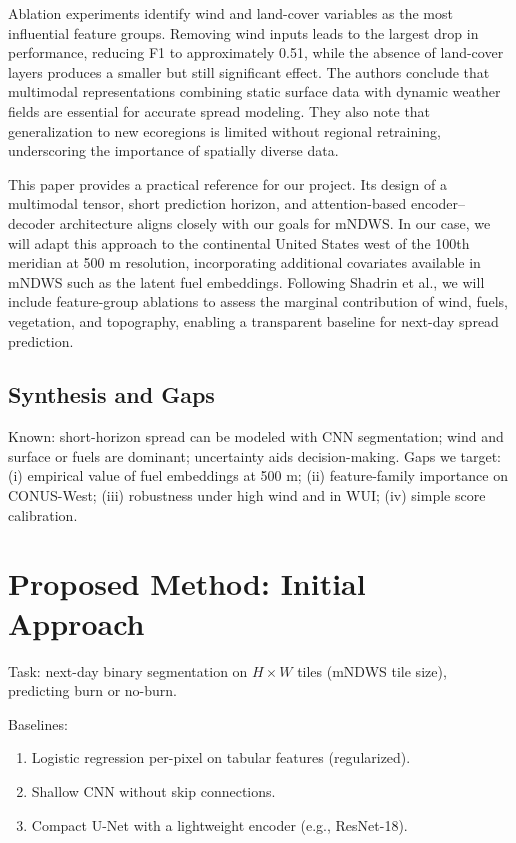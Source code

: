 \documentclass[conference]{IEEEtran}
\begin{document}
Ablation experiments identify wind and land-cover variables as the most influential feature groups. Removing wind inputs leads to the largest drop in performance, reducing F1 to approximately 0.51, while the absence of land-cover layers produces a smaller but still significant effect. The authors conclude that multimodal representations combining static surface data with dynamic weather fields are essential for accurate spread modeling. They also note that generalization to new ecoregions is limited without regional retraining, underscoring the importance of spatially diverse data.

This paper provides a practical reference for our project. Its design of a multimodal tensor, short prediction horizon, and attention-based encoder–decoder architecture aligns closely with our goals for mNDWS. In our case, we will adapt this approach to the continental United States west of the 100th meridian at 500 m resolution, incorporating additional covariates available in mNDWS such as the latent fuel embeddings. Following Shadrin et al., we will include feature-group ablations to assess the marginal contribution of wind, fuels, vegetation, and topography, enabling a transparent baseline for next-day spread prediction.

\subsection{Synthesis and Gaps}
Known: short-horizon spread can be modeled with CNN segmentation; wind and surface or fuels are dominant; uncertainty aids decision-making. Gaps we target: (i) empirical value of fuel embeddings at 500 m; (ii) feature-family importance on CONUS-West; (iii) robustness under high wind and in WUI; (iv) simple score calibration.

\section{Proposed Method: Initial Approach}
Task: next-day binary segmentation on $H\times W$ tiles (mNDWS tile size), predicting burn or no-burn.

Baselines:
\begin{enumerate}
    \item Logistic regression per-pixel on tabular features (regularized).
    \item Shallow CNN without skip connections.
    \item Compact U-Net with a lightweight encoder (e.g., ResNet-18).
\end{enumerate}
\end{document}
